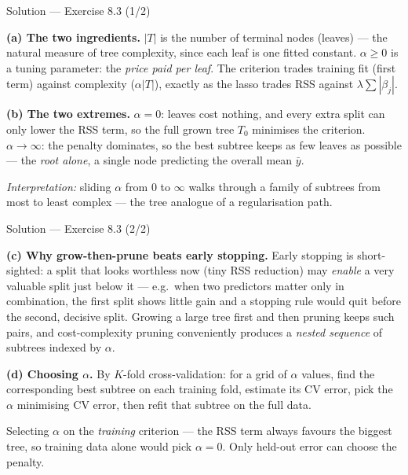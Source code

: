 \documentclass[aspectratio=169,11pt]{beamer}
\begin{document}
\begin{frame}{Solution --- Exercise 8.3 (1/2)}
\begin{solutionbox}
\textbf{(a) The two ingredients.} $|T|$ is the number of terminal nodes (leaves) --- the natural measure of tree complexity, since each leaf is one fitted constant. $\alpha\ge 0$ is a tuning parameter: the \emph{price paid per leaf}. The criterion trades training fit (first term) against complexity ($\alpha|T|$), exactly as the lasso trades RSS against $\lambda\sum|\beta_j|$.

\medskip
\textbf{(b) The two extremes.} $\alpha=0$: leaves cost nothing, and every extra split can only lower the RSS term, so the full grown tree $T_0$ minimises the criterion. $\alpha\to\infty$: the penalty dominates, so the best subtree keeps as few leaves as possible --- the \emph{root alone}, a single node predicting the overall mean $\bar y$.

\medskip
\emph{Interpretation:} sliding $\alpha$ from $0$ to $\infty$ walks through a family of subtrees from most to least complex --- the tree analogue of a regularisation path.
\end{solutionbox}
\end{frame}

\begin{frame}{Solution --- Exercise 8.3 (2/2)}
\begin{solutionbox}
\textbf{(c) Why grow-then-prune beats early stopping.} Early stopping is short-sighted: a split that looks worthless now (tiny RSS reduction) may \emph{enable} a very valuable split just below it --- e.g.\ when two predictors matter only in combination, the first split shows little gain and a stopping rule would quit before the second, decisive split. Growing a large tree first and then pruning keeps such pairs, and cost-complexity pruning conveniently produces a \emph{nested sequence} of subtrees indexed by $\alpha$.

\medskip
\textbf{(d) Choosing $\alpha$.} By $K$-fold cross-validation: for a grid of $\alpha$ values, find the corresponding best subtree on each training fold, estimate its CV error, pick the $\alpha$ minimising CV error, then refit that subtree on the full data.
\end{solutionbox}
\begin{mistake}
Selecting $\alpha$ on the \emph{training} criterion --- the RSS term always favours the biggest tree, so training data alone would pick $\alpha=0$. Only held-out error can choose the penalty.
\end{mistake}
\end{frame}
\end{document}
